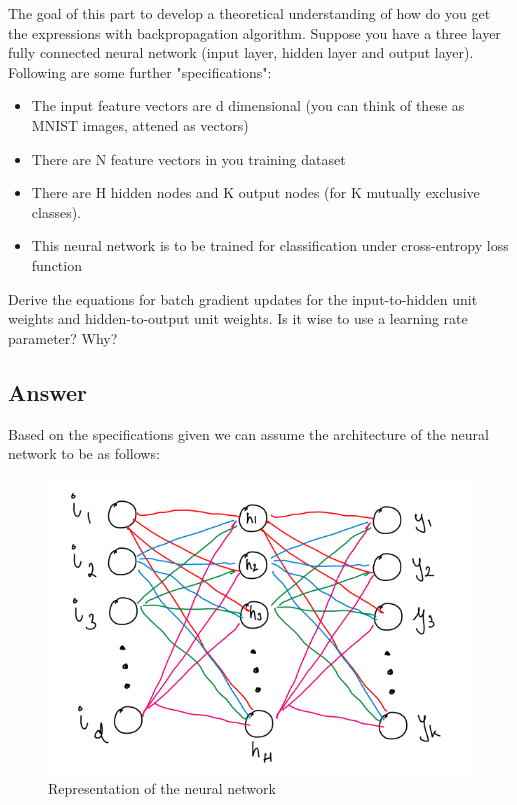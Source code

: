 \documentclass[a4paper, 12pt]{article}
\begin{document}
    The goal of this part to develop a theoretical understanding of how do you get the expressions with
    backpropagation algorithm. Suppose you have a three layer fully connected neural network (input layer,
    hidden layer and output layer). Following are some further "specifications":

    \begin{itemize}
        \item The input feature vectors are d dimensional (you can think of these as MNIST images, attened as vectors)
        \item There are N feature vectors in you training dataset
        \item There are H hidden nodes and K output nodes (for K mutually exclusive classes).
        \item This neural network is to be trained for classification under cross-entropy loss function
    \end{itemize}

    Derive the equations for batch gradient updates for the input-to-hidden unit weights and hidden-to-output
    unit weights. Is it wise to use a learning rate parameter? Why?

    \subsection{Answer}

    Based on the specifications given we can assume the architecture of the neural network to be as follows:

    \begin{figure}[h!]
        \centering
        \captionsetup{justification=centering}
        \includegraphics[scale = 0.35]{1.png}
        \caption{Representation of the neural network}
    \end{figure}
    
\end{document}
